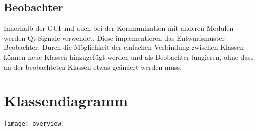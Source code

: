 \subsection{Beobachter}
Innerhalb der GUI und auch bei der Kommunikation mit anderen Modulen werden Qt-Signale verwendet. Diese implementieren das Entwurfsmuster Beobachter. Durch die Möglichkeit der einfachen Verbindung zwischen Klassen können neue Klassen hinzugefügt werden und als Beobachter fungieren, ohne dass an der beobachteten Klassen etwas geändert werden muss.

\section{Klassendiagramm}
\texttt{[image: overview]}

